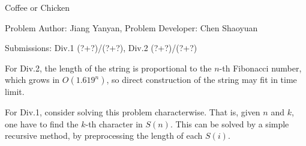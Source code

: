 \begin{Solution}{Coffee or Chicken}

\begin{frame}{\ProblemName}

\small Problem Author: Jiang Yanyan, Problem Developer: Chen Shaoyuan \par \vspace{0.3cm}

\small Submissions: Div.1 (?+?)/(?+?), Div.2 (?+?)/(?+?) \par \vspace{0.5cm}

For Div.2, the length of the string is proportional to the $n$-th Fibonacci number, which grows in $O(1.619^n)$, so direct construction of the string may fit in time limit.

For Div.1, consider solving this problem characterwise. That is, given $n$ and $k$, one have to find the $k$-th character in $S(n)$. This can be solved by a simple recursive method, by preprocessing the length of each $S(i)$.

\end{frame}

\end{Solution}
